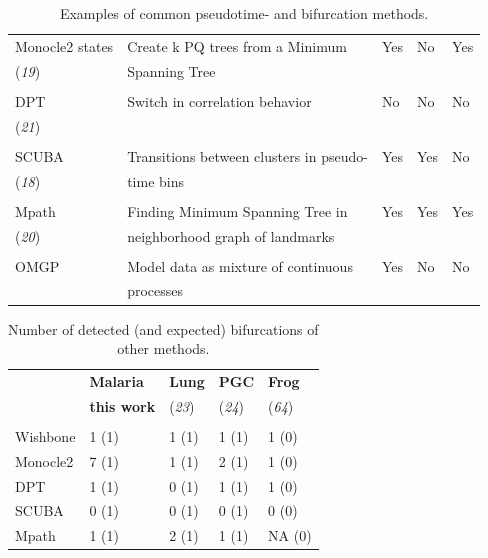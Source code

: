 \begin{table}
\begin{tabularx}{0.95\textwidth}{lllll}
Monocle2 states & Create k PQ trees from a Minimum & Yes & No & Yes \\
({\it 19}) & Spanning Tree & & & \\ & & & &\\
DPT & Switch in correlation behavior & No & No & No \\
({\it 21}) & & & & \\  & & & & \\
SCUBA & Transitions between clusters in pseudo-& Yes & Yes & No \\
({\it 18}) & time bins & & & \\  & & & & \\
Mpath & Finding Minimum Spanning Tree in & Yes & Yes & Yes \\
({\it 20}) & neighborhood graph of landmarks &  & &  \\ & & & & \\
OMGP & Model data as mixture of continuous& Yes & No & No \\
& processes & & & \\
\end{tabularx}
\caption{Examples of common pseudotime- and bifurcation methods.}
\label{tab:alternatives}
\end{table}

\begin{table}
\centering
\begin{tabularx}{0.95\textwidth}{lllll}
 & \textbf{Malaria} & \textbf{Lung} & \textbf{PGC} & \textbf{Frog} \\
 & \textbf{this work} & ({\it 23}) & ({\it 24}) & ({\it 64}) \\
\hline \\ 
Wishbone & 1 (1) & 1 (1) & 1 (1) & 1 (0) \\
Monocle2 & 7 (1) & 1 (1) & 2 (1) & 1 (0) \\
DPT & 1 (1) & 0 (1) & 1 (1) & 1 (0) \\
SCUBA & 0 (1) & 0 (1) & 0 (1) & 0 (0) \\
Mpath & 1 (1) & 2 (1) & 1 (1) & NA (0) \\
\end{tabularx}
\caption{Number of detected (and expected) bifurcations of other methods.}
\label{tab:alternatives_out}
\end{table}
